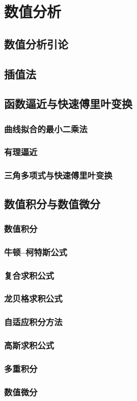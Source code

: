 \part{数值分析}
\chapter{数值分析引论}





\chapter{插值法}







\chapter{函数逼近与快速傅里叶变换}



\section{曲线拟合的最小二乘法}
\section{有理逼近}
\section{三角多项式与快速傅里叶变换}

\chapter{数值积分与数值微分}
\section{数值积分}
\section{牛顿--柯特斯公式}
\section{复合求积公式}
\section{龙贝格求积公式}
\section{自适应积分方法}
\section{高斯求积公式}
\section{多重积分}
\section{数值微分}
